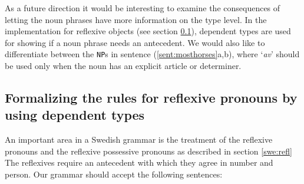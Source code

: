 \documentclass{report}
\begin{document}
As a future direction it would be interesting to examine the consequences of
letting the noun phrases have more information on the type level. In the
implementation for reflexive objects  (see section \ref{sec:reflexives}),
dependent types are used for showing if a noun phrase 
needs an antecedent.
We would also like to differentiate between the \verb-NP-s in sentence
(\ref{sent:mosthorses}a,b), where 
`\emph{av}' should be used
only when the noun has an explicit article or determiner.
\label{sent:mosthorses}



% 
\subsection{Formalizing the rules for reflexive pronouns by using dependent types}
\label{sec:reflexives}
An important area in a Swedish grammar is the treatment of the reflexive pronouns and
the reflexive possessive pronouns as described in section \ref{swe:refl} 
The reflexives require an antecedent with which they agree in
number and person.
Our grammar should accept the following sentences:
\end{document}

